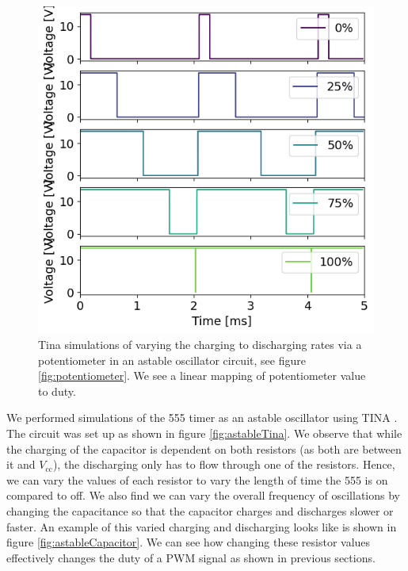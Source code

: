\documentclass[%
 reprint,
 amsmath,amssymb,
 aps,
]{revtex4-2}
\begin{document}
        \begin{figure}
        \includegraphics[width=0.9\columnwidth]{Images/potentiometerDuty.png}
        \caption{\label{fig:potentiometerDuty}Tina simulations of varying the charging to discharging rates via a potentiometer in an astable oscillator circuit, see figure \ref{fig:potentiometer}. We see a linear mapping of potentiometer value to duty.}
        \end{figure}

        We performed simulations of the 555 timer as an astable oscillator using TINA \cite{tina}. The circuit was set up as shown in figure \ref{fig:astableTina}. We observe that while the charging of the capacitor is dependent on both  resistors (as both are between it and $V_\text{cc}$), the discharging only has to flow through one of the resistors. Hence, we can vary the values of each resistor to vary the length of time the 555 is on compared to off. We also find we can vary the overall frequency of oscillations by changing the capacitance so that the capacitor charges and discharges slower or faster. An example of this varied charging and discharging looks like is shown in figure \ref{fig:astableCapacitor}. We can see how changing these resistor values effectively changes the duty of a PWM signal as shown in previous sections.\\
\end{document}
